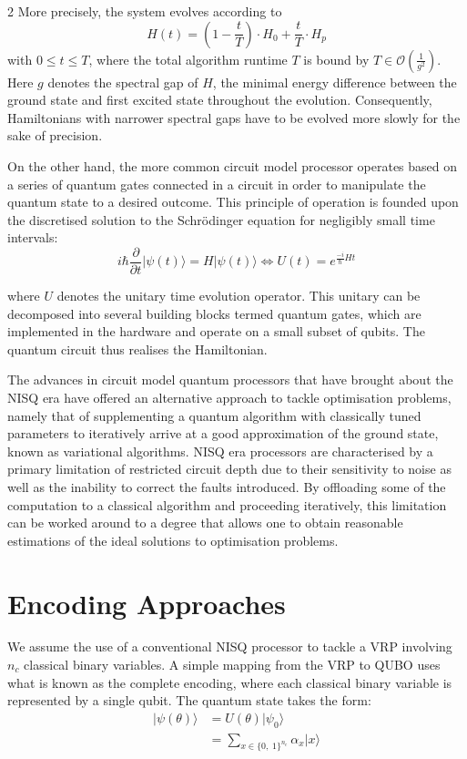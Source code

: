 \documentclass [10pt]{article}
\newcommand {\qvec}[1] {\vert #1 \rangle}
\begin{document}
\begin {multicols}{2}
More precisely, the system evolves according to
\begin {equation}
H(t) = \left(1 - \frac{t}{T}\right) \cdot H_0 + \frac{t}{T} \cdot H_p
\end {equation}
with $0 \leq t \leq T$, where the total algorithm runtime $T$ is bound by
$T \in \mathcal{O}(\frac{1}{g^2})$. Here $g$ denotes the spectral gap of $H$,
the minimal energy difference between the ground state and first excited
state throughout the evolution. Consequently, Hamiltonians with narrower
spectral gaps have to be evolved more slowly for the sake of precision.

On the other hand, the more common circuit model processor operates based on a
series of quantum gates connected in a circuit in order to manipulate the
quantum state to a desired outcome. This principle of operation is founded
upon the discretised solution to the Schrödinger equation for negligibly small
time intervals:
\begin {equation}
i \hbar \frac{\partial}{\partial t} \qvec{\psi(t)} = H \qvec{\psi(t)}
\Longleftrightarrow
U(t) = e^{\frac{-i}{\hbar}Ht}
\end {equation}

where $U$ denotes the unitary time evolution operator. This unitary can be
decomposed into several building blocks termed quantum gates, which are
implemented in the hardware and operate on a small subset of qubits. The
quantum circuit thus realises the Hamiltonian.

The advances in circuit model quantum processors that have brought
about the NISQ era have offered an alternative approach to tackle optimisation
problems, namely that of supplementing a quantum algorithm with classically
tuned parameters to iteratively arrive at a good approximation of the ground
state, known as variational algorithms. NISQ era processors are characterised
by a primary limitation of restricted circuit depth due to their sensitivity
to noise as well as the inability to correct the faults introduced. By
offloading some of the computation to a classical algorithm and proceeding
iteratively, this limitation can be worked around to a degree that allows
one to obtain reasonable estimations of the ideal solutions to optimisation
problems.


\section {Encoding Approaches}
We assume the use of a conventional NISQ processor to tackle a VRP involving
$n_c$ classical binary variables. A simple mapping from the VRP to QUBO uses
what is known as the complete encoding, where each classical binary variable
is represented by a single qubit. The quantum state takes the form:
\begin {align}
\qvec{\psi(\theta)} 
&= U(\theta)\qvec{\psi_0} \\
&= \sum_{x \in \{0, \; 1\}^{n_c}} \alpha_x \qvec{x}
\end {align}


\end{multicols}
\end{document}
